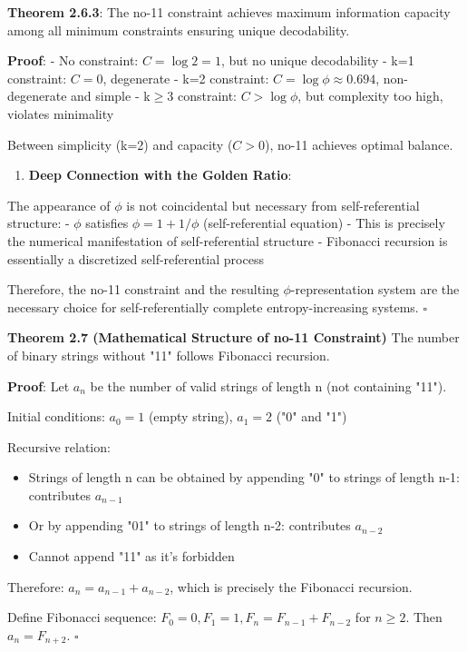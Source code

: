    \textbf{Theorem 2.6.3}: The no-11 constraint achieves maximum information capacity among all minimum constraints ensuring unique decodability.
\label{thm:2.6.3}
   
   \textbf{Proof}:
   - No constraint: $C = \log 2 = 1$, but no unique decodability
   - k=1 constraint: $C = 0$, degenerate
   - k=2 constraint: $C = \log \phi \approx 0.694$, non-degenerate and simple
   - k$\geq$3 constraint: $C > \log \phi$, but complexity too high, violates minimality
   
   Between simplicity (k=2) and capacity ($C > 0$), no-11 achieves optimal balance.

\begin{enumerate}
\item \textbf{Deep Connection with the Golden Ratio}:
\end{enumerate}
   
   The appearance of $\phi$ is not coincidental but necessary from self-referential structure:
   - $\phi$ satisfies $\phi = 1 + 1/\phi$ (self-referential equation)
   - This is precisely the numerical manifestation of self-referential structure
   - Fibonacci recursion is essentially a discretized self-referential process

Therefore, the no-11 constraint and the resulting $\phi$-representation system are the necessary choice for self-referentially complete entropy-increasing systems. $\square$

\textbf{Theorem 2.7 (Mathematical Structure of no-11 Constraint)}
\label{thm:2.7}
The number of binary strings without "11" follows Fibonacci recursion.

\textbf{Proof}:
Let $a_n$ be the number of valid strings of length n (not containing "11").

Initial conditions: $a_0 = 1$ (empty string), $a_1 = 2$ ("0" and "1")

Recursive relation:
\begin{itemize}
\item Strings of length n can be obtained by appending "0" to strings of length n-1: contributes $a_{n-1}$
\item Or by appending "01" to strings of length n-2: contributes $a_{n-2}$
\item Cannot append "11" as it's forbidden
\end{itemize}

Therefore: $a_n = a_{n-1} + a_{n-2}$, which is precisely the Fibonacci recursion.

Define Fibonacci sequence: $F_0 = 0, F_1 = 1, F_n = F_{n-1} + F_{n-2}$ for $n \geq 2$.
Then $a_n = F_{n+2}$. $\square$

